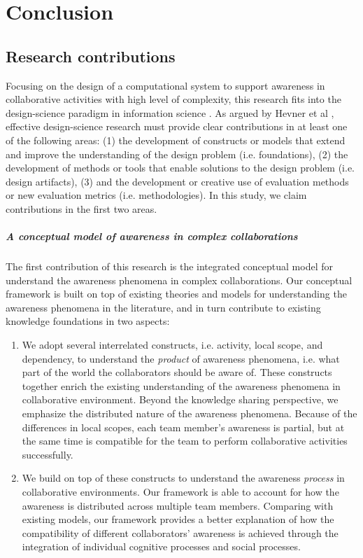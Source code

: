 \graphicspath{{Figures/}}

\chapter{Conclusion} %
\label{cha:conclusion}
\section{Research contributions} %
\label{sec:contributions}
Focusing on the design of a computational system to support awareness in collaborative activities with high level of complexity, this research fits into the design-science paradigm in information science \cite{Hevner2004}. As argued by Hevner et al \cite{Hevner2004}, effective design-science research must provide clear contributions in at least one of the following areas: (1) the development of constructs or models that extend and improve the understanding of the design problem (i.e. foundations), (2) the development of methods or tools that enable solutions to the design problem (i.e. design artifacts), (3) and the development or creative use of evaluation methods or new evaluation metrics (i.e. methodologies). In this study, we claim contributions in the first two areas. 

\paragraph*{A conceptual model of awareness in complex collaborations} %
\label{par:a_conceptual_model_of_awareness_in_complex_collaborations}
The first contribution of this research is the integrated conceptual model for understand the awareness phenomena in complex collaborations. Our conceptual framework is built on top of existing theories and models for understanding the awareness phenomena in the literature, and in turn contribute to existing knowledge foundations in two aspects:

\begin{enumerate}
	\item We adopt several interrelated constructs, i.e. activity, local scope, and dependency, to understand the \emph{product} of awareness phenomena, i.e. what part of the world the collaborators should be aware of. These constructs together enrich the existing understanding of the awareness phenomena in collaborative environment. Beyond the knowledge sharing perspective, we emphasize the distributed nature of the awareness phenomena. Because of the differences in local scopes, each team member's awareness is partial, but at the same time is compatible for the team to perform collaborative activities successfully.
	\item We build on top of these constructs to understand the awareness \emph{process} in collaborative environments. Our framework is able to account for how the awareness is distributed across multiple team members. Comparing with existing models, our framework provides a better explanation of how the compatibility of different collaborators' awareness is achieved through the integration of individual cognitive processes and social processes.
\end{enumerate}

